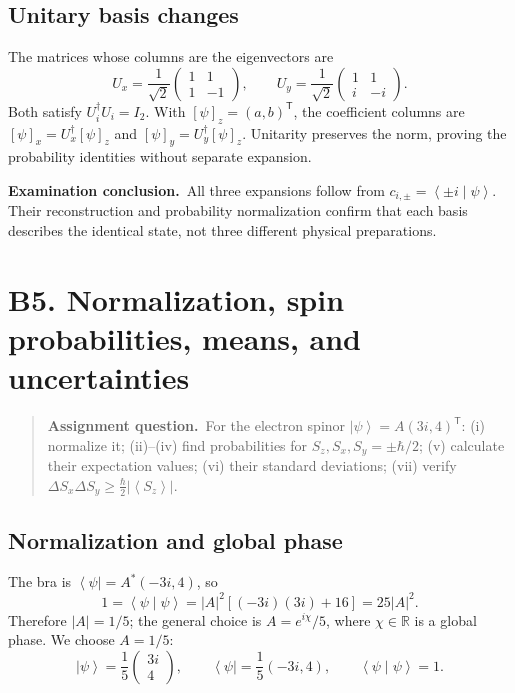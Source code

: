 \documentclass[11pt,a4paper]{article}
\theoremstyle{definition}
\newcommand{\ket}[1]{\left|#1\right\rangle}
\newcommand{\bra}[1]{\left\langle#1\right|}
\newcommand{\avg}[1]{\left\langle #1\right\rangle}
\newcommand{\ip}[2]{\left\langle#1\middle|#2\right\rangle}
\newenvironment{question}{\begin{quote}\small\noindent\textbf{Assignment question.}\ }{\end{quote}}
\newcommand{\exam}[1]{\par\medskip\noindent\textbf{Examination conclusion.}\ #1\par}
\begin{document}
\subsection{Unitary basis changes}
The matrices whose columns are the eigenvectors are
\begin{equation}
U_x=\frac1{\sqrt2}\begin{pmatrix}1&1\\1&-1\end{pmatrix},\qquad
U_y=\frac1{\sqrt2}\begin{pmatrix}1&1\\i&-i\end{pmatrix}.
\end{equation}
Both satisfy \(U_i^\dagger U_i=I_2\). With \([\psi]_z=(a,b)^{\mathsf T}\), the coefficient columns are \([\psi]_x=U_x^\dagger[\psi]_z\) and \([\psi]_y=U_y^\dagger[\psi]_z\). Unitarity preserves the norm, proving the probability identities without separate expansion.
\exam{All three expansions follow from \(c_{i,\pm}=\ip{\pm i}{\psi}\). Their reconstruction and probability normalization confirm that each basis describes the identical state, not three different physical preparations.}

\section{B5. Normalization, spin probabilities, means, and uncertainties}
\begin{question}For the electron spinor \(\ket\psi=A(3i,4)^{\mathsf T}\): (i) normalize it; (ii)--(iv) find probabilities for \(S_z,S_x,S_y=\pm\hbar/2\); (v) calculate their expectation values; (vi) their standard deviations; (vii) verify \(\Delta S_x\Delta S_y\ge\frac\hbar2|\avg{S_z}|\).\end{question}
\subsection{Normalization and global phase}
The bra is \(\bra\psi=A^*(-3i,4)\), so
\begin{equation}
1=\ip\psi\psi=|A|^2[(-3i)(3i)+16]=25|A|^2.
\end{equation}
Therefore \(|A|=1/5\); the general choice is \(A=e^{i\chi}/5\), where \(\chi\in\mathbb R\) is a global phase. We choose \(A=1/5\):
\begin{equation}
\boxed{\ket\psi=\frac15\begin{pmatrix}3i\\4\end{pmatrix},\qquad
\bra\psi=\frac15(-3i,4),\qquad\ip\psi\psi=1.}
\label{eq:given-spinor}
\end{equation}
\end{document}
